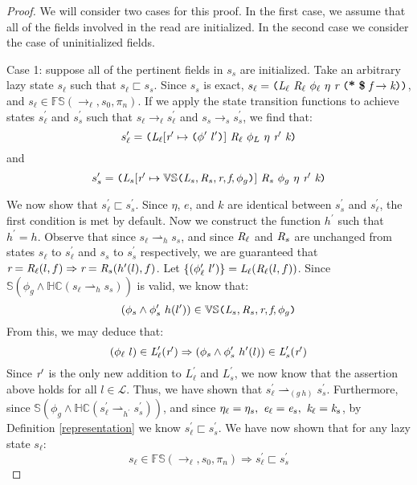 \begin{proof}
We will consider two cases for this proof. In the first case, we assume that all of the fields involved in the read are initialized. In the second case we consider the case of uninitialized fields. 

Case 1: suppose all of the pertinent fields in $s_s$ are initialized. Take an arbitrary lazy state $s_\ell$ such that $s_\ell \sqsubset s_s$. Since $s_s$ is exact,  $s_\ell = \lp \cfgnt{L}_{\ell}\ \cfgnt{R}_{\ell}\ \phi_\ell\ \eta\ \cfgnt{r}\ \lp \cfgt{*}\ \cfgt{\$}\ \cfgnt{f} \rightarrow \cfgnt{k} \rp \rp$, and $s_\ell \in \mathbb{FS}(\rightarrow_{\ell},s_0,\pi_n)$. If we apply the state transition functions to achieve states $s_\ell^\prime$ and $s_s^\prime$ such that $s_\ell \rightarrow_\ell s_\ell^\prime$ and  $s_s \rightarrow_s s_s^\prime$, we find that:
$$s_\ell^\prime = \lp \cfgnt{L}_{\ell} [\cfgnt{r}^\prime \mapsto \lp\phi^\prime\ l^\prime\rp]\ \cfgnt{R}_{\ell}\ \phi_L\ \eta\ \cfgnt{r}^\prime\ \cfgnt{k}\rp $$
 and 
 $$ s_s^\prime = \lp \cfgnt{L}_{s}[\cfgnt{r}^\prime \mapsto \mathbb{VS}\lp \cfgnt{L}_{s},\cfgnt{R}_{s},\cfgnt{r},\cfgnt{f},\phi_g\rp ]\ \cfgnt{R}_{s}\ \phi_g\ \eta\ \cfgnt{r}^\prime\ \cfgnt{k}\rp $$

We now show that $s_\ell^\prime \sqsubset s_s^\prime$. Since $\eta$, $e$, and $k$ are identical between $s_s^\prime$ and $s_\ell^\prime $, the first condition is met by default. Now we construct the function $h^\prime$ such that $h^\prime = h$. Observe that since $s_\ell \rightharpoonup_{h} s_s$, and since $\emph{R}_\ell$ and $\emph{R}_s$ are unchanged from states $s_\ell$ to $s_\ell^\prime$ and $s_s$ to $s_s^\prime$ respectively, we are guaranteed that $ \emph{r} = \emph{R}_\ell(l,f) \Rightarrow \emph{r} = \emph{R}_s(h^\prime(l),f)$. Let $\{(\phi_\ell^\prime\ l^\prime)\} =  \emph{L}_\ell(\emph{R}_\ell(l,f))$. Since $\mathbb{S}(\phi_g \wedge \mathbb{HC}(s_\ell \rightharpoonup_{h} s_s))$ is valid, we know that:
 $$(\phi_s \wedge \phi_s^\prime\ h(l^\prime)) \in \mathbb{VS}\texttt{(} \emph{L}_{s},\emph{R}_{s},\emph{r},\emph{f},\phi_g\texttt{)}$$ 
From this, we may deduce that:
$$ (\phi_\ell\ l) \in \emph{L}_\ell^\prime(\emph{r}^\prime) \Rightarrow (\phi_s \wedge \phi_s^\prime\ h^\prime(l))\in \emph{L}_s^\prime(\emph{r}^\prime)$$
Since $\emph{r}^\prime$ is the only new addition to $L_\ell^\prime$ and $L_s^\prime$, we now know that the assertion above holds for all $l \in \mathcal{L}$. Thus, we have shown that $s_\ell^\prime \rightharpoonup_{(g\ h)} s_s^\prime$. Furthermore, since $\mathbb{S}(\phi_g \wedge \mathbb{HC}(s_\ell^\prime \rightharpoonup_{h^\prime} s_s^\prime))$, and since $\eta_{\ell} = \eta_{s} ,\ \cfgnt{e}_{\ell} = \cfgnt{e}_{s} ,\ \cfgnt{k}_{\ell} = \cfgnt{k}_{s}$, by Definition \ref{representation} we know $s_\ell^\prime \sqsubset s_s^\prime$. We have now shown that for any lazy state $s_\ell$: 
\begin{equation}
\label{eqn:slimpliesslprime}
s_\ell \in \mathbb{FS}(\rightarrow_{\ell},s_0,\pi_n) \Rightarrow s_\ell^\prime \sqsubset s_s^\prime
\end{equation}


\end{proof}
